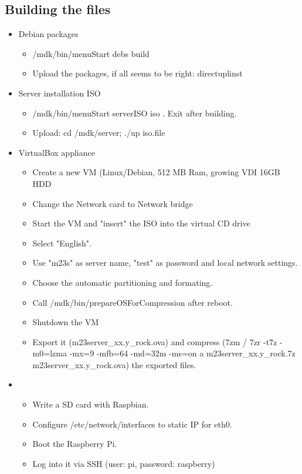 \subsection{Building the files}
\begin{itemize}
\item Debian packages
	\begin{itemize}
		\item /mdk/bin/menuStart \Rightarrow debs \Rightarrow build
		\item Upload the packages, if all seems to be right: \Rightarrow directuplinst
	\end{itemize}
\item Server installation ISO
	\begin{itemize}
		\item /mdk/bin/menuStart \Rightarrow serverISO \Rightarrow iso . Exit after building.
		\item Upload: cd /mdk/server; ./up iso.file
	\end{itemize}
\item VirtualBox appliance
	\begin{itemize}
		\item Create a new VM (Linux/Debian, 512 MB Ram, growing VDI 16GB HDD
		\item Change the Network card to Network bridge
		\item Start the VM and "insert" the ISO into the virtual CD drive
		\item Select "English".
		\item Use "m23s" as server name, "test" as password and local network settings.
		\item Choose the automatic partitioning and formating.
		\item Call /mdk/bin/prepareOSForCompression after reboot.
		\item Shutdown the VM
		\item Export it (m23server_xx.y_rock.ova) and compress (7zm / 7zr -t7z -m0=lzma -mx=9 -mfb=64 -md=32m -ms=on a m23server_xx.y_rock.7z m23server_xx.y_rock.ova) the exported files.
	\end{itemize}
\item
	\begin{itemize}
		\item Write a SD card with Raspbian.
		\item Configure /etc/network/interfaces to static IP for eth0.
		\item Boot the Raspberry Pi.
		\item Log into it via SSH (user: pi, password: raspberry)

\end{itemize}
\end{itemize}

